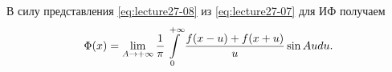 \begin{consequence}
  В силу представления \eqref{eq:lecture27-08} из \eqref{eq:lecture27-07} для ИФ получаем
  \begin{equation}
    \Phi(x) = \lim\limits_{A \to +\infty}\dfrac{1}{\pi}\int\limits_0^{+\infty}\dfrac{f(x - u) + f(x + u)}{u}\sin Audu.
  \end{equation}
\end{consequence}
